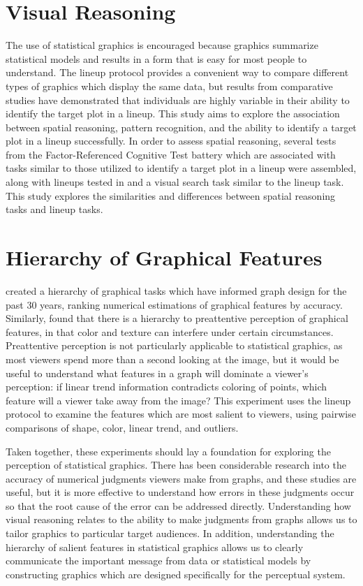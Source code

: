 \documentclass[11pt]{isuthesis}\usepackage[]{graphicx}\usepackage[]{color}
\begin{document}
\section{Visual Reasoning}
The use of statistical graphics is encouraged because graphics summarize statistical models and results in a form that is easy for most people to understand. The lineup protocol provides a convenient way to compare different types of graphics which display the same data, but results from comparative studies\citep{hofmann2012graphical} have demonstrated that individuals are highly variable in their ability to identify the target plot in a lineup. This study aims to explore the association between spatial reasoning, pattern recognition, and the ability to identify a target plot in a lineup successfully. In order to assess spatial reasoning, several tests from the Factor-Referenced Cognitive Test battery \citep{ekstrom1976manual} which are associated with tasks similar to those utilized to identify a target plot in a lineup were assembled, along with lineups tested in \citep{hofmann2012graphical} and a visual search task similar to the lineup task. This study explores the similarities and differences between spatial reasoning tasks and lineup tasks. 

\section{Hierarchy of Graphical Features}
\citet{cleveland:1984} created a hierarchy of graphical tasks which have informed graph design for the past 30 years, ranking numerical estimations of graphical features by accuracy. Similarly, \citet{healey1999large} found that there is a hierarchy to preattentive perception of graphical features, in that color and texture can interfere under certain circumstances. Preattentive perception is not particularly applicable to statistical graphics, as most viewers spend more than a second looking at the image, but it would be useful to understand what features in a graph will dominate a viewer's perception: if linear trend information contradicts coloring of points, which feature will a viewer take away from the image? This experiment uses the lineup protocol to examine the features which are most salient to viewers, using pairwise comparisons of shape, color, linear trend, and outliers. 

Taken together, these experiments should lay a foundation for exploring the perception of statistical graphics. There has been considerable research into the accuracy of numerical judgments viewers make from graphs, and these studies are useful, but it is more effective to understand how errors in these judgments occur so that the root cause of the error can be addressed directly. Understanding how visual reasoning relates to the ability to make judgments from graphs allows us to tailor graphics to particular target audiences. In addition, understanding the hierarchy of salient features in statistical graphics allows us to clearly communicate the important message from data or statistical models by constructing graphics which are designed specifically for the perceptual system. 
\end{document}
